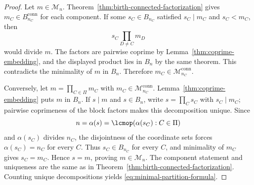 \begin{proof}
Let $m\in\mathcal M_n$. Theorem~\ref{thm:birth-connected-factorization}
gives $m_C\in B_{n_C}^{\mathrm{conn}}$ for each component. If some
$s_C\in B_{n_C}$ satisfied $s_C\mid m_C$ and $s_C<m_C$, then
\[
s_C\prod_{D\ne C}m_D
\]
would divide $m$. The factors are pairwise coprime by
Lemma~\ref{thm:coprime-embedding}, and the displayed product lies in
$B_n$ by the same theorem. This contradicts the minimality of $m$ in $B_n$.
Therefore $m_C\in\mathcal M_{n_C}^{\mathrm{conn}}$.

Conversely, let $m=\prod_{C\in\Pi}m_C$ with
$m_C\in\mathcal M_{n_C}^{\mathrm{conn}}$. Lemma~\ref{thm:coprime-embedding}
puts $m$ in $B_n$. If $s\mid m$ and $s\in B_n$, write
$s=\prod_C s_C$ with $s_C\mid m_C$; pairwise coprimeness of the block
factors makes this decomposition unique. Since
\[
n=\alpha(s)=\lcmop(\alpha(s_C):C\in\Pi)
\]
and $\alpha(s_C)$ divides $n_C$, the disjointness of the coordinate sets
forces $\alpha(s_C)=n_C$ for every $C$. Thus $s_C\in B_{n_C}$ for every
$C$, and minimality of $m_C$ gives $s_C=m_C$. Hence $s=m$, proving
$m\in\mathcal M_n$. The component statement and uniqueness are the same as
in Theorem~\ref{thm:birth-connected-factorization}. Counting unique
decompositions yields \eqref{eq:minimal-partition-formula}.
\end{proof}

